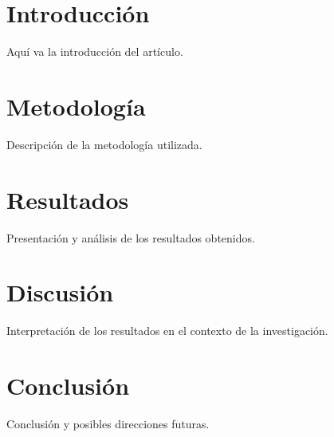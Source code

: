 \documentclass{cyta}
\title{\documentTitle}
\author{\authorName \\ \affiliation}
\date{\today}
\begin{document}
\maketitle

\begin{abstract}
    \abstractText
\end{abstract}

\section{Introducción}
Aquí va la introducción del artículo.

\section{Metodología}
Descripción de la metodología utilizada.

\section{Resultados}
Presentación y análisis de los resultados obtenidos.

\section{Discusión}
Interpretación de los resultados en el contexto de la investigación.

\section{Conclusión}
Conclusión y posibles direcciones futuras.



\end{document}
